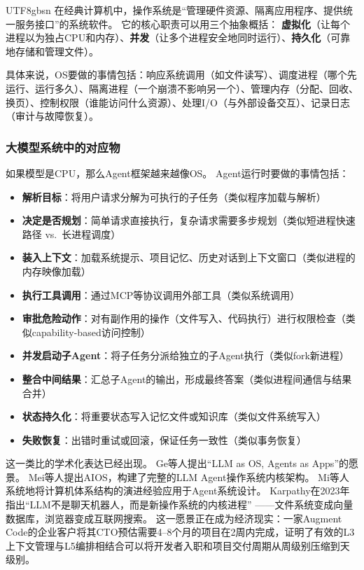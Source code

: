 \documentclass[11pt,a4paper]{article}
\begin{document}
\begin{CJK*}{UTF8}{gbsn}
在经典计算机中，操作系统是``管理硬件资源、隔离应用程序、提供统一服务接口''的系统软件\cite{ostep_2023}。
它的核心职责可以用三个抽象概括：
\textbf{虚拟化}（让每个进程以为独占CPU和内存）、\textbf{并发}（让多个进程安全地同时运行）、\textbf{持久化}（可靠地存储和管理文件）。

具体来说，OS要做的事情包括：响应系统调用（如文件读写）、调度进程（哪个先运行、运行多久）、隔离进程（一个崩溃不影响另一个）、管理内存（分配、回收、换页）、控制权限（谁能访问什么资源）、处理I/O（与外部设备交互）、记录日志（审计与故障恢复）。

\subsubsection{大模型系统中的对应物}

如果模型是CPU，那么Agent框架越来越像OS。
Agent运行时要做的事情包括：
\begin{itemize}[nosep]
\item \textbf{解析目标}：将用户请求分解为可执行的子任务（类似程序加载与解析）
\item \textbf{决定是否规划}：简单请求直接执行，复杂请求需要多步规划（类似短进程快速路径 vs.\ 长进程调度）
\item \textbf{装入上下文}：加载系统提示、项目记忆、历史对话到上下文窗口（类似进程的内存映像加载）
\item \textbf{执行工具调用}：通过MCP等协议调用外部工具（类似系统调用）
\item \textbf{审批危险动作}：对有副作用的操作（文件写入、代码执行）进行权限检查（类似capability-based访问控制）
\item \textbf{并发启动子Agent}：将子任务分派给独立的子Agent执行（类似fork新进程）
\item \textbf{整合中间结果}：汇总子Agent的输出，形成最终答案（类似进程间通信与结果合并）
\item \textbf{状态持久化}：将重要状态写入记忆文件或知识库（类似文件系统写入）
\item \textbf{失败恢复}：出错时重试或回滚，保证任务一致性（类似事务恢复）
\end{itemize}

这一类比的学术化表达已经出现。
Ge等人提出``LLM as OS, Agents as Apps''的愿景\cite{ge2023llmos}。
Mei等人提出AIOS，构建了完整的LLM Agent操作系统内核架构\cite{mei2024aios}。
Mi等人系统地将计算机体系结构的演进经验应用于Agent系统设计\cite{mi2025llmagentscomputersystems}。
Karpathy在2023年指出``LLM不是聊天机器人，而是新操作系统的内核进程''%
\cite{karpathy2023llmos}——文件系统变成向量数据库，浏览器变成互联网搜索。
这一愿景正在成为经济现实：一家Augment Code的企业客户将其CTO预估需要4--8个月的项目在2周内完成\cite{anthropic2026agenticreport}，证明了有效的L3上下文管理与L5编排相结合可以将开发者入职和项目交付周期从周级别压缩到天级别。


\end{CJK*}
\end{document}
